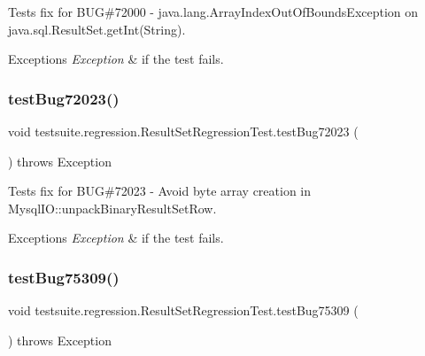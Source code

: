 Tests fix for B\+UG\#72000 -\/ java.\+lang.\+Array\+Index\+Out\+Of\+Bounds\+Exception on java.\+sql.\+Result\+Set.\+get\+Int(\+String).


\begin{DoxyExceptions}{Exceptions}
{\em Exception} & if the test fails. \\
\hline
\end{DoxyExceptions}
\mbox{\label{classtestsuite_1_1regression_1_1_result_set_regression_test_a86a107fd1b712bfc306b455d84d42572}} 
\subsubsection{\texorpdfstring{test\+Bug72023()}{testBug72023()}}
{\footnotesize\ttfamily void testsuite.\+regression.\+Result\+Set\+Regression\+Test.\+test\+Bug72023 (\begin{DoxyParamCaption}{ }\end{DoxyParamCaption}) throws Exception}

Tests fix for B\+UG\#72023 -\/ Avoid byte array creation in Mysql\+I\+O\+::unpack\+Binary\+Result\+Set\+Row.


\begin{DoxyExceptions}{Exceptions}
{\em Exception} & if the test fails. \\
\hline
\end{DoxyExceptions}
\mbox{\label{classtestsuite_1_1regression_1_1_result_set_regression_test_a21e609d74da6fad0483aeeec66375c7d}} 
\subsubsection{\texorpdfstring{test\+Bug75309()}{testBug75309()}}
{\footnotesize\ttfamily void testsuite.\+regression.\+Result\+Set\+Regression\+Test.\+test\+Bug75309 (\begin{DoxyParamCaption}{ }\end{DoxyParamCaption}) throws Exception}

